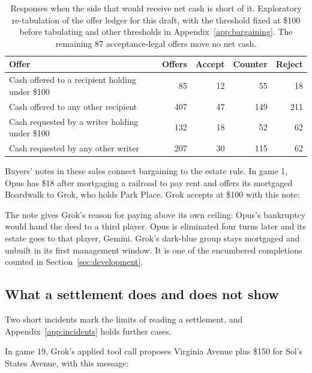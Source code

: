 \begin{table}[t]
\centering\small
\begin{tabular}{lrrrr}
\toprule
Offer & Offers & Accept & Counter & Reject\\
\midrule
Cash offered to a recipient holding under \$100 & 85 & 12 & 55 & 18\\
Cash offered to any other recipient & 407 & 47 & 149 & 211\\
Cash requested by a writer holding under \$100 & 132 & 18 & 52 & 62\\
Cash requested by any other writer & 207 & 30 & 115 & 62\\
\bottomrule
\end{tabular}
\caption{Responses when the side that would receive net cash is short of it. Exploratory re-tabulation of the offer ledger for this draft, with the threshold fixed at \$100 before tabulating and other thresholds in Appendix~\ref{app:bargaining}. The remaining 87 acceptance-legal offers move no net cash.}
\label{tab:cashpoor}
\end{table}

Buyers' notes in these sales connect bargaining to the estate rule. In game 1, Opus has \$18 after mortgaging a railroad to pay rent and offers its mortgaged Boardwalk to Grok, who holds Park Place. Grok accepts at \$100 with this note:


The note gives Grok's reason for paying above its own ceiling: Opus's bankruptcy would hand the deed to a third player. Opus is eliminated four turns later and its estate goes to that player, Gemini. Grok's dark-blue group stays mortgaged and unbuilt in its first management window. It is one of the encumbered completions counted in Section~\ref{sec:development}.

\subsection{What a settlement does and does not show}

Two short incidents mark the limits of reading a settlement, and Appendix~\ref{app:incidents} holds further cases.


In game 19, Grok's applied tool call proposes Virginia Avenue plus \$150 for Sol's States Avenue, with this message:


